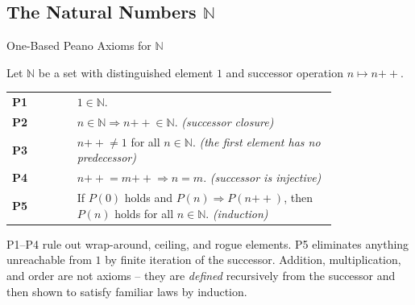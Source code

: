 

\subsection*{\texorpdfstring{The Natural Numbers $\mathbb{N}$}{The Natural Numbers N}}

\begin{topicbox}{One-Based Peano Axioms for $\mathbb{N}$}
\begin{exposition}
Let $\mathbb{N}$ be a set with distinguished element $1$
and successor operation $n \mapsto n{+\!\!+}$.

\medskip
\begin{tabular}{@{} l p{0.80\linewidth} @{}}
\textbf{P1} & $1 \in \mathbb{N}$. \\[4pt]
\textbf{P2} & $n \in \mathbb{N} \Rightarrow n{+\!\!+} \in \mathbb{N}$.
             \hfill\textit{(successor closure)} \\[4pt]
\textbf{P3} & $n{+\!\!+} \neq 1$ for all $n \in \mathbb{N}$.
             \hfill\textit{(the first element has no predecessor)} \\[4pt]
\textbf{P4} & $n{+\!\!+} = m{+\!\!+} \Rightarrow n = m$.
             \hfill\textit{(successor is injective)} \\[4pt]
\textbf{P5} & If $P(0)$ holds and $P(n) \Rightarrow P(n{+\!\!+})$,
             then $P(n)$ holds for all $n \in \mathbb{N}$.
             \hfill\textit{(induction)} \\
\end{tabular}
\end{exposition}
\end{topicbox}

\begin{remark*}
P1--P4 rule out wrap-around, ceiling, and rogue elements.
P5 eliminates anything unreachable from $1$ by finite iteration of the
successor.
Addition, multiplication, and order are not axioms -- they are \emph{defined}
recursively from the successor and then shown to satisfy familiar laws by
induction.
\end{remark*}

